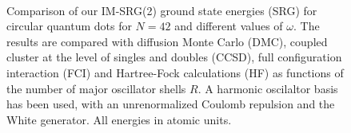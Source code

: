 \begin{figure}
  \centering
    \\
   
  \caption{Comparison of our IM-SRG(2) ground state energies (SRG) for circular quantum dots for $N=42$ and different values of $\omega$. The results are compared with diffusion Monte Carlo (DMC), coupled cluster at the level of singles and doubles (CCSD), full configuration interaction (FCI) and Hartree-Fock calculations (HF) as functions of the number of major oscillator shells $R$. A harmonic oscilaltor basis has been used, with an unrenormalized Coulomb repulsion and the White generator. All energies in atomic units.}
  \label{fig:N42}
\end{figure}

